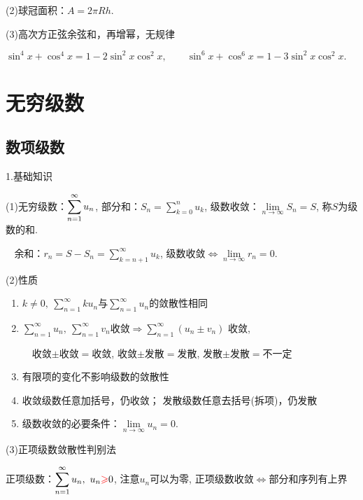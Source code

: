 \documentclass[UTF8]{ctexart}
\newcommand\no{\noindent}
\newcommand\dis{\displaystyle}
\newcommand\gs{\geqslant}
\newcommand\limn{\dis\lim\limits_{n\to\infty}}
\newcommand\sumn{\dis\sum\limits_{n=1}^{\infty}}
\newcommand\sumkn{\dis\sum\limits_{k=0}^n}
\begin{document}
\begin{spacing}{2}
\begin{center}

\end{center}

(2)球冠面积：$A=2\pi Rh.$

(3)高次方正弦余弦和，再增幂，无规律

\centerline{$\sin^4x+\cos^4x=1-2\sin^2x\cos^2x,
\qquad
\sin^6x+\cos^6x=1-3\sin^2x\cos^2x.$}

\newpage

\section{无穷级数}

\subsection{数项级数}

\no1.基础知识

\no(1)无穷级数：$\dis\sumn u_n$, 部分和：$S_n=\sumkn u_k$, 
级数收敛：$\limn S_n=S$, 称$S$为级数的和.

\no$\ \ \ \ $余和：$r_n=S-S_n=\dis\sum\limits_{k=n+1}^\infty u_k$, 
级数收敛$\Longleftrightarrow\limn r_n=0.$

\no(2)性质

\begin{enumerate}[itemindent=1.4em, label=(\alph*)]

\item $k\neq0,\ \sumn ku_n$与$\sumn u_n$的敛散性相同

\item $\sumn u_n,\ \sumn v_n$收敛$\Longrightarrow\sumn(u_n\pm v_n)$
收敛, 

\vspace{0.2cm}

$\quad$收敛$\pm$收敛$=$收敛, 收敛$\pm$发散$=$发散, 发散$\pm$发散$=$不一定 

\item 有限项的变化不影响级数的敛散性

\item 收敛级数任意\textcolor[rgb]{1,0,0}{加括号}，仍收敛；
发散级数任意\textcolor[rgb]{1,0,0}{去括号(拆项)}，仍发散

\item 级数收敛的必要条件：$\limn u_n=0.$

\end{enumerate}

\no(3)正项级数敛散性判别法

正项级数：$\sumn u_n,\ u_n \textcolor[rgb]{1,0,0}{\gs}0$, 注意$u_n$可以为零, 
正项级数收敛$\Longleftrightarrow$部分和序列有上界


\end{spacing}
\end{document}
